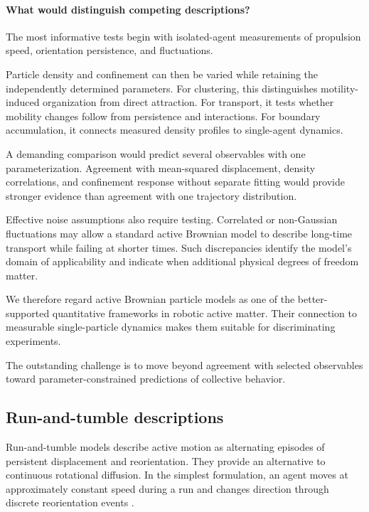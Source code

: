 \paragraph*{What would distinguish competing descriptions?}

The most informative tests begin
with isolated-agent measurements
of propulsion speed,
orientation persistence,
and fluctuations.

Particle density and confinement
can then be varied while retaining
the independently determined
parameters. For clustering,
this distinguishes motility-induced
organization from direct attraction.
For transport, it tests whether
mobility changes follow from
persistence and interactions.
For boundary accumulation,
it connects measured density
profiles to single-agent dynamics.

A demanding comparison would
predict several observables
with one parameterization.
Agreement with mean-squared
displacement, density correlations,
and confinement response without
separate fitting would provide
stronger evidence than agreement
with one trajectory distribution.

Effective noise assumptions
also require testing.
Correlated or non-Gaussian
fluctuations may allow
a standard active Brownian
model to describe long-time
transport while failing
at shorter times.
Such discrepancies identify
the model's domain of
applicability and indicate
when additional physical
degrees of freedom matter.

We therefore regard active
Brownian particle models
as one of the better-supported
quantitative frameworks in
robotic active matter.
Their connection to measurable
single-particle dynamics
makes them suitable for
discriminating experiments.

The outstanding challenge is
to move beyond agreement
with selected observables
toward parameter-constrained
predictions of collective
behavior.

\subsection{Run-and-tumble descriptions}
\label{sec:theory-run-tumble}

Run-and-tumble models describe active motion as alternating
episodes of persistent displacement and reorientation.
They provide an alternative to continuous rotational
diffusion. In the simplest formulation, an agent moves
at approximately constant speed during a run and changes
direction through discrete reorientation events
\cite{Tailleur2008runtumble}.

